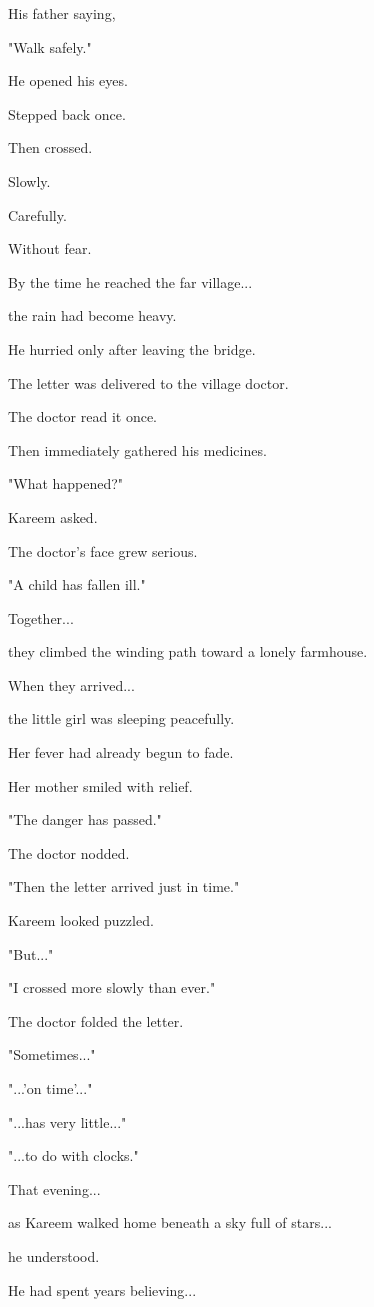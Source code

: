\documentclass[12pt,openany]{book}
\begin{document}
His father saying,

"Walk safely."

He opened his eyes.

Stepped back once.

Then crossed.

Slowly.

Carefully.

Without fear.

By the time he reached the far village...

the rain had become heavy.

He hurried only after leaving the bridge.

The letter was delivered to the village doctor.

The doctor read it once.

Then immediately gathered his medicines.

"What happened?"

Kareem asked.

The doctor's face grew serious.

"A child has fallen ill."

Together...

they climbed the winding path toward a lonely farmhouse.

When they arrived...

the little girl was sleeping peacefully.

Her fever had already begun to fade.

Her mother smiled with relief.

"The danger has passed."

The doctor nodded.

"Then the letter arrived just in time."

Kareem looked puzzled.

"But..."

"I crossed more slowly than ever."

The doctor folded the letter.

"Sometimes..."

"...'on time'..."

"...has very little..."

"...to do with clocks."

That evening...

as Kareem walked home beneath a sky full of stars...

he understood.

He had spent years believing...
\end{document}
